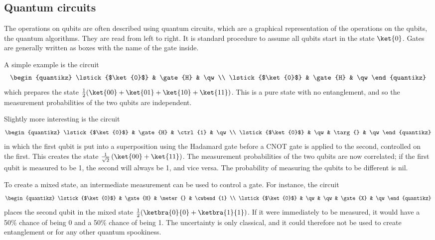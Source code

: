 \subsection{Quantum circuits}
The operations on qubits are often described using quantum circuits, which are a graphical representation of the operations on the qubits, the quantum algorithms.
They are read from left to right.
It is standard procedure to assume all qubits start in the state $\ket{0}$.
Gates are generally written as boxes with the name of the gate inside.

A simple example is the circuit
\begin{equation}
    \begin{quantikz}
        \lstick{$\ket{0}$} & \gate{H} & \qw \\
        \lstick{$\ket{0}$} & \gate{H} & \qw
    \end{quantikz}
\end{equation}
which prepares the state $\frac{1}{2}(\ket{00} + \ket{01} + \ket{10} + \ket{11})$.
This is a pure state with no entanglement, and so the measurement probabilities of the two qubits are independent.

Slightly more interesting is the circuit
\begin{equation}
    \begin{quantikz}
        \lstick{$\ket{0}$} & \gate{H} & \ctrl{1} & \qw \\
        \lstick{$\ket{0}$} & \qw & \targ{} & \qw
    \end{quantikz}
\end{equation}
in which the first qubit is put into a superposition using the Hadamard gate before a CNOT gate is applied to the second, controlled on the first.
This creates the state $\frac{1}{\sqrt{2}}\left(\ket{00} + \ket{11}\right)$.
The measurement probabilities of the two qubits are now correlated; if the first qubit is measured to be 1, the second will always be 1, and vice versa.
The probability of measuring the qubits to be different is nil.

To create a mixed state, an intermediate measurement can be used to control a gate.
For instance, the circuit
\begin{equation}
    \begin{quantikz}
        \lstick{$\ket{0}$} & \gate{H} & \meter{} & \cwbend{1} \\
        \lstick{$\ket{0}$} & \qw & \qw & \gate{X} & \qw
    \end{quantikz}
\end{equation}
places the second qubit in the mixed state $\frac{1}{2}(\ketbra{0}{0} + \ketbra{1}{1})$.
If it were immediately to be measured, it would have a 50\% chance of being 0 and a 50\% chance of being 1.
The uncertainty is only classical, and it could therefore not be used to create entanglement or for any other quantum spookiness.

